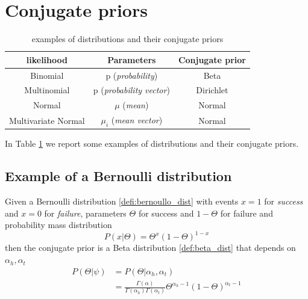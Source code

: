 \section{Conjugate priors}
    
    \begin{table}
        \centering
        \begin{tabular}{|c|c|c|}
            \hline
            \textbf{likelihood} & \textbf{Parameters} & \textbf{Conjugate prior}  \\
            \hline
            Binomial & p (\textit{probability}) & Beta  \\
            \hline
            Multinomial & p (\textit{probability vector}) & Dirichlet \\
            \hline
            Normal & $\mu$ (\textit{mean}) & Normal \\
            \hline
            Multivariate Normal & $\mu_i$ (\textit{mean vector}) & Normal \\
            \hline
        \end{tabular}
        \caption{examples of distributions and their conjugate priors}
        \label{table:conj_priors}
    \end{table}
    
    In Table \ref{table:conj_priors} we report some examples of distributions and their conjugate priors.\\

    \subsection{Example of a Bernoulli distribution}
        Given a Bernoulli distribution \ref{defi:bernoullo_dist} with events $x=1$ for \textit{success} and $x=0$ for \textit{failure}, parameters $\Theta$ for success and $1-\Theta$ for failure and probability mass distribution 
        $$P(x|\Theta) = \Theta^x(1-\Theta)^{1-x}$$
        then the conjugate prior is a Beta distribution \ref{def:beta_dist} that depends on $\alpha_h, \alpha_t$
        \begin{align*}
        P(\Theta|\psi)  &= P(\Theta|\alpha_h, \alpha_t)\\
                        &= \frac{\Gamma(\alpha)}{\Gamma(\alpha_h)\Gamma(\alpha_t)} \Theta^{\alpha_h -1} (1-\Theta)^{\alpha_t -1}
        \end{align*}
        
